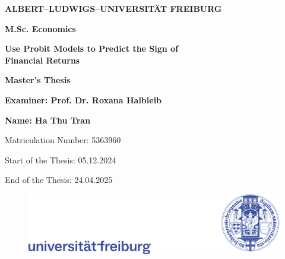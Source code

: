 

\begin{titlepage}
\begin{center}
\vspace{1cm}

\textbf{\Large ALBERT–LUDWIGS–UNIVERSITÄT FREIBURG}

\vspace{0.5cm}
\textbf{\Large M.Sc. Economics}

\vspace{2cm}
\textbf{\Large Use Probit Models to Predict the Sign of \\Financial Returns}

\vspace{1.5cm}
\textbf{Master's Thesis}

\vspace{0.5cm}
\textbf{Examiner: Prof. Dr. Roxana Halbleib}

\vspace{0.5cm}
\textbf{Name: Ha Thu Tran}

\vspace{0.5cm}
Matriculation Number: 5363960

\vspace{0.5cm}
Start of the Thesis: 05.12.2024

\vspace{0.5cm}
End of the Thesis: 24.04.2025

\vspace{2cm}
\end{center}
 \vfill 
    \begin{figure}[b]
        \centering
        \includegraphics[width=\linewidth]{figures/title page/logo.pdf}
    \end{figure}
\end{titlepage}


\restoregeometry